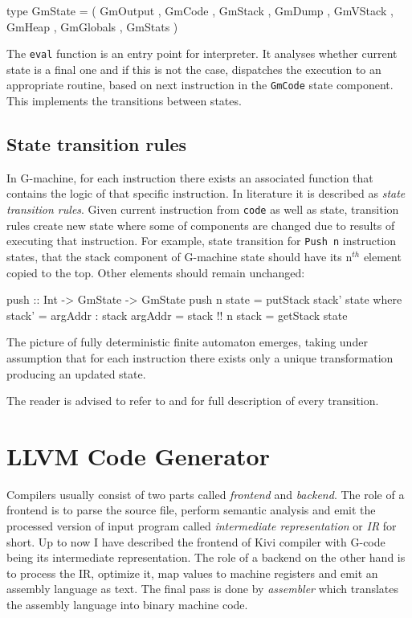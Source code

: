 \documentclass[12pt,a4paper]{report}
\begin{document}
\vspace*{0.2in}
\begin{code}[style=haskell]
type GmState = ( GmOutput
               , GmCode
               , GmStack
               , GmDump
               , GmVStack
               , GmHeap
               , GmGlobals
               , GmStats )
\end{code}

The \texttt{eval} function is an entry point for interpreter. It analyses
whether current state is a final one and if this is not the case, dispatches
the execution to an appropriate routine, based on next instruction in the
\texttt{GmCode} state component. This implements the transitions between states.

\subsection{State transition rules}
In G-machine, for each instruction there exists an associated function that
contains the logic of that specific instruction. In literature it is described
as \textit{state transition rules}. Given current instruction from
\texttt{code} as well as state, transition rules create new state where some of
components are changed due to results of executing that instruction. For
example, state transition for \texttt{Push n} instruction states, that the
stack component of G-machine state should have its n$^{th}$ element copied to
the top. Other elements should remain unchanged:

\vspace*{0.2in}
\begin{code}[style=haskell]
push :: Int -> GmState -> GmState
push n state =
    putStack stack' state
    where
        stack' = argAddr : stack
        argAddr = stack !! n
        stack = getStack state
\end{code}

The picture of fully deterministic finite automaton emerges, taking under
assumption that for each instruction there exists only a unique transformation
producing an updated state.

The reader is advised to refer to \cite{Jon87} and \cite{JonLes00} for full
description of every transition.

\section{LLVM Code Generator}
\label{sec:llvm_codegen}
Compilers usually consist of two parts called \textit{frontend} and
\textit{backend}. The role of a frontend is to parse the source file, perform
semantic analysis and emit the processed version of input program called
\textit{intermediate representation} or \textit{IR} for short. Up to now I have
described the frontend of Kivi compiler with G-code being its intermediate
representation. The role of a backend on the other hand is to process the IR,
optimize it, map values to machine registers and emit an assembly language as
text. The final pass is done by \textit{assembler} which translates the
assembly language into binary machine code.
\end{document}
